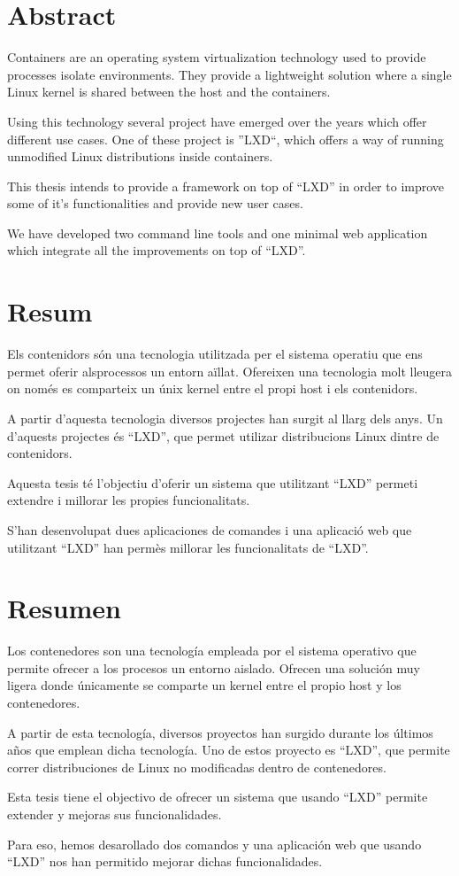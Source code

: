 \section*{Abstract}
Containers are an operating system virtualization technology used to provide processes isolate environments. They provide a lightweight solution where a single Linux kernel is shared between the host and the containers.

Using this technology several project have emerged over the years which offer different use cases.
One of these project is ''LXD``, which offers a way of running unmodified Linux distributions inside containers.

This thesis intends to provide a framework on top of ``LXD'' in order to improve some of it's
functionalities and provide new user cases.

We have developed two command line tools and one minimal web application which integrate all the improvements on top of ``LXD''.


\newpage
\section*{Resum}
Els contenidors són una tecnologia utilitzada per el sistema operatiu que ens permet oferir alsprocessos un entorn aïllat. Ofereixen una tecnologia molt lleugera on només es comparteix un únix kernel entre el propi host i els contenidors.

A partir d'aquesta tecnologia diversos projectes han surgit al llarg dels anys. Un d'aquests projectes és ``LXD'', que permet utilizar distribucions Linux dintre de contenidors.

Aquesta tesis té l'objectiu d'oferir un sistema que utilitzant ``LXD'' permeti extendre i millorar les propies funcionalitats.

S'han desenvolupat dues aplicaciones de comandes i una aplicació web que utilitzant ``LXD'' han permès millorar les funcionalitats de ``LXD''.



\newpage
\section*{Resumen}
Los contenedores son una tecnología empleada por el sistema operativo que permite ofrecer
a los procesos un entorno aislado. Ofrecen una solución muy ligera donde
únicamente se comparte un kernel entre el propio host y los contenedores.

A partir de esta tecnología, diversos proyectos han surgido durante los últimos años que
emplean dicha tecnología. Uno de estos proyecto es ``LXD'', que permite correr distribuciones de Linux no modificadas dentro de contenedores.

Esta tesis tiene el objectivo de ofrecer un sistema que usando ``LXD'' permite extender y mejoras sus funcionalidades.

Para eso, hemos desarollado dos comandos y una aplicación web que usando ``LXD'' nos han permitido mejorar dichas funcionalidades.

